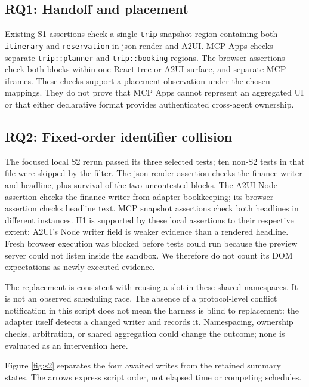 \documentclass[11pt]{article}
\newcounter{none}
\begin{document}
\subsection{RQ1: Handoff and placement}\label{rq1-handoff-and-placement}

Existing S1 assertions check a single \texttt{trip} snapshot region
containing both \texttt{itinerary} and \texttt{reservation} in
json-render and A2UI. MCP Apps checks separate \texttt{trip::planner}
and \texttt{trip::booking} regions. The browser assertions check both
blocks within one React tree or A2UI surface, and separate MCP iframes.
These checks support a placement observation under the chosen mappings.
They do not prove that MCP Apps cannot represent an aggregated UI or
that either declarative format provides authenticated cross-agent
ownership.

\subsection{RQ2: Fixed-order identifier
collision}\label{rq2-fixed-order-identifier-collision}

The focused local S2 rerun passed its three selected tests; ten non-S2
tests in that file were skipped by the filter. The json-render assertion
checks the finance writer and headline, plus survival of the two
uncontested blocks. The A2UI Node assertion checks the finance writer
from adapter bookkeeping; its browser assertion checks headline text.
MCP snapshot assertions check both headlines in different instances. H1
is supported by these local assertions to their respective extent;
A2UI's Node writer field is weaker evidence than a rendered headline.
Fresh browser execution was blocked before tests could run because the
preview server could not listen inside the sandbox. We therefore do not
count its DOM expectations as newly executed evidence.

The replacement is consistent with reusing a slot in these shared
namespaces. It is not an observed scheduling race. The absence of a
protocol-level conflict notification in this script does not mean the
harness is blind to replacement: the adapter itself detects a changed
writer and records it. Namespacing, ownership checks, arbitration, or
shared aggregation could change the outcome; none is evaluated as an
intervention here.

Figure \ref{fig:s2} separates the four awaited writes from the retained
summary states. The arrows express script order, not elapsed time or
competing schedules.
\end{document}
